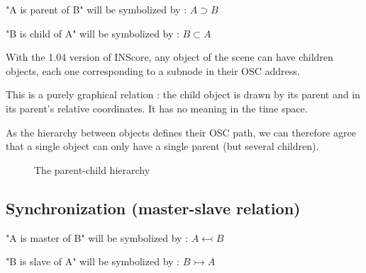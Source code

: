 \documentclass[a4paper]{article}
\newcommand{\parent}			{\supset}
\newcommand{\child}			{\subset}
\newcommand{\master}			{\leftarrowtail}
\newcommand{\slave}			{\rightarrowtail}
\begin{document}
"A is parent of B" will be symbolized by : $A \parent B$

"B is child of A" will be symbolized by : $B \child A$

\bigskip

With the 1.04 version of INScore, any object of the scene can have children objects, each one corresponding to a subnode in their OSC address. 

This is a purely graphical relation : the child object is drawn by its parent and in its parent's relative coordinates. It has no meaning in the time space. 

As the hierarchy between objects defines their OSC path, we can therefore agree that a single object can only have a single parent (but several children). 

\bigskip

\begin{figure}[h]
\begin{center}

 \caption{The parent-child hierarchy}
 \label{fig:hierarchy}

\end{center}
\end{figure}

\subsection{Synchronization (master-slave relation)}\label{subsec:sync}

"A is master of B" will be symbolized by : $A \master B$

"B is slave of A" will be symbolized by : $B \slave A$
\bigskip
\end{document}
